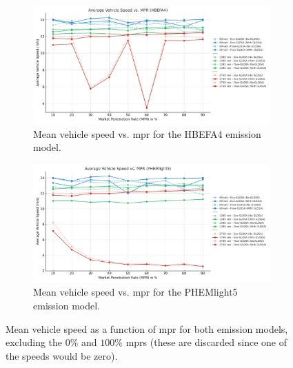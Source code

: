 \begin{figure}[htb]
  \centering
  \begin{subfigure}[b]{0.49\textwidth}
    \includegraphics[width=\textwidth]{data/img/AverageVehicleSpeed/AvgSpeedHBEFA4Combined.pdf}
    \caption{Mean vehicle speed vs. \ac{mpr} for the HBEFA4 emission model.}
    \label{fig:MeanSpeed_HBEFA4_all}
  \end{subfigure}\hfill
  \begin{subfigure}[b]{0.49\textwidth}
    \includegraphics[width=\textwidth]{data/img/AverageVehicleSpeed/AvgSpeedPHEMlight5Combined.pdf}
    \caption{Mean vehicle speed vs. \ac{mpr} for the PHEMlight5 emission model.}
    \label{fig:MeanSpeed_PHEM_all}
  \end{subfigure}
  \caption[Mean vehicle speed vs. \ac{mpr} for both emission models]{Mean vehicle speed as a function of \ac{mpr} for both emission models, excluding the $0\%$ and $100\%$ \acp{mpr} (these are discarded since one of the speeds would be zero).}
  \label{fig:MeanSpeed_Combined}
\end{figure}

